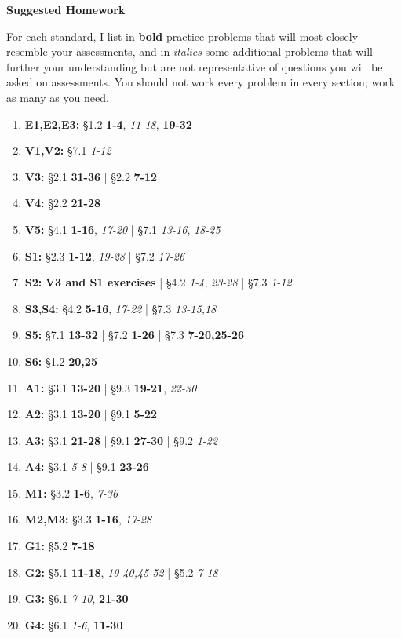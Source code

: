 \documentclass{article}
\begin{document}
\begin{center}
\Large \textbf{Suggested Homework}
\end{center}

\newcommand{\closeExamples}{\textbf}
\newcommand{\otherExamples}{\textit}
\newcommand{\standards}[1]{\item[\textbf{#1}]}

For each standard, I list in \closeExamples{bold} practice problems that will most closely resemble your assessments, and in \otherExamples{italics} some additional problems that will further your understanding but are not representative of questions you will be asked on assessments.  You should not work every problem in every section; work as many as you need.

\begin{enumerate}
  \standards{E1,E2,E3:} \S 1.2
    \closeExamples{1-4},
    \otherExamples{11-18},
    \closeExamples{19-32}


  \standards{V1,V2:} \S 7.1
    \otherExamples{1-12}

  \standards{V3:} \S 2.1
    \closeExamples{31-36}
    | \S 2.2
    \closeExamples{7-12}

  \standards{V4:} \S 2.2
    \closeExamples{21-28}

  \standards{V5:} \S 4.1
    \closeExamples{1-16},
    \otherExamples{17-20}
    | \S 7.1
    \otherExamples{13-16},
    \otherExamples{18-25}

  \standards{S1:} \S 2.3
    \closeExamples{1-12},
    \otherExamples{19-28}
    | \S 7.2
    \otherExamples{17-26}

  \standards{S2:}
    \closeExamples{\textbf{V3} and \textbf{S1} exercises}
    | \S 4.2
    \otherExamples{1-4},
    \otherExamples{23-28}
    | \S 7.3
    \otherExamples{1-12}

  \standards{S3,S4:} \S 4.2
    \closeExamples{5-16},
    \otherExamples{17-22}
    | \S 7.3
    \otherExamples{13-15,18}

   \standards{S5:} \S 7.1 \closeExamples{13-32} | \S 7.2 \closeExamples{1-26} | \S 7.3 \closeExamples{7-20,25-26}

   \standards{S6:} \S 1.2 \closeExamples{20,25}

  \standards{A1:} \S 3.1 \closeExamples{13-20} | \S 9.3 \closeExamples{19-21}, \otherExamples{22-30}
  \standards{A2:} \S 3.1 \closeExamples{13-20} | \S 9.1 \closeExamples{5-22}
  \standards{A3:} \S 3.1 \closeExamples{21-28} | \S 9.1 \closeExamples{27-30} | \S 9.2 \otherExamples{1-22}
  \standards{A4:} \S 3.1 \otherExamples{5-8} | \S 9.1 \closeExamples{23-26}
  \standards{M1:} \S 3.2 \closeExamples{1-6}, \otherExamples{7-36}
  \standards{M2,M3:} \S 3.3 \closeExamples{1-16}, \otherExamples{17-28}
  \standards{G1:} \S 5.2 \closeExamples{7-18}
  \standards{G2:} \S 5.1 \closeExamples{11-18}, \otherExamples{19-40,45-52} | \S 5.2 \otherExamples{7-18}
  \standards{G3:} \S 6.1 \otherExamples{7-10}, \closeExamples{21-30}
  \standards{G4:} \S 6.1 \otherExamples{1-6}, \closeExamples{11-30}
\end{enumerate}
\end{document}
